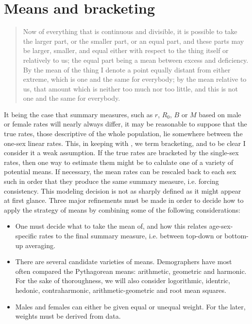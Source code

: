 \documentclass[reqno,12pt,oneside,a4paper]{report} %
\theoremstyle{plain}
\theoremstyle{definition}
\theoremstyle{remark}
\numberwithin{theorem}{chapter}     %
\begin{document}
\section{Means and bracketing}

\begin{singlespace}
\begin{quote}
Now of everything that is continuous and divisible, it is possible to take the larger part, or the smaller part, or an equal part, and these parts may be larger, smaller, and equal either with respect to the thing itself or relatively to us; the equal part being a mean between excess and deficiency. By the mean of the thing I denote a point equally distant from either extreme, which is one and the same for everybody; by the mean relative to us, that amount which is neither too much nor too little, and this is not one and the same for everybody.
\end{quote}
\end{singlespace}


It being the case that summary measures, such as $r$, $R_0$, $B$ or $M$ based on male or female rates will nearly always differ, it may be reasonable to suppose that the true rates, those descriptive of the whole population, lie somewhere between the one-sex linear rates. This, in keeping with \citet{yellin1977comparison}, we term bracketing, and to be clear I consider it a weak assumption. If the true rates are bracketed by the single-sex rates, then one way to estimate them might be to calulate one of a variety of potential means. If necessary, the mean rates can be rescaled back to each sex such in order that they produce the same summary measure, i.e. forcing consistency. This modeling decision is not as sharply defined as it might appear at first glance. Three major refinements must be made in order to decide how to apply the strategy of means by combining some of the following considerations:

\begin{itemize}
\item One must decide what to take the mean of, and how this relates age-sex-specific rates to the final summary measure, i.e. between top-down or bottom-up averaging.
\item There are several candidate varieties of means. Demographers have most often compared the Pythagorean means: arithmetic, geometric and harmonic. For the sake of thoroughness, we will also consider logorithmic, identric, hedonic, contraharmonic, arithmetic-geometric and root mean squares.
\item Males and females can either be given equal or unequal weight. For the later, weights must be derived from data.
\end{itemize}
\end{document}
